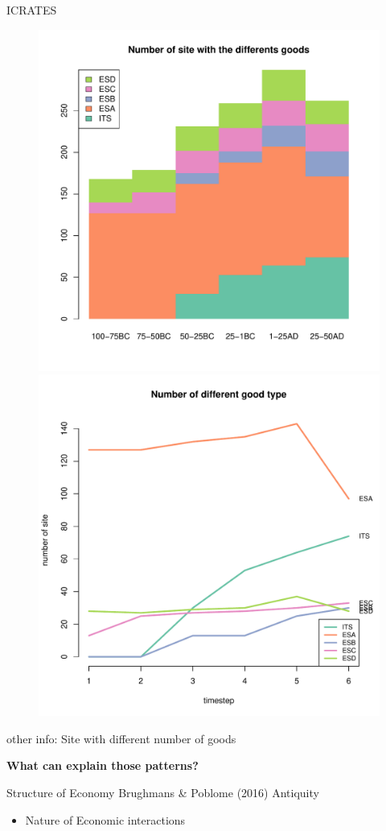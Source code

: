 \documentclass[12pt, notes=show]{beamer}
\begin{document}
\begin{frame}{ICRATES}
 \begin{figure}
     \includegraphics[width=.45\textwidth]{../images/hmNbSiteWGoodData.pdf}
     \includegraphics[width=.45\textwidth]{../images/plotNbSiteWGoodData.pdf}
     
 \end{figure}
 \begin{center}
     \tiny other info: Site with different number of goods
 \end{center}
\end{frame}



\begin{frame}{}
    \centering
    \Huge
    \bf
    What can explain those patterns?
\end{frame}

\begin{frame}{Structure of Economy}
    Brughmans \& Poblome (2016) Antiquity
    \begin{itemize}
	\item<1-> Nature of Economic interactions
	\begin{center}
	\end{center}
    \end{itemize}
\end{frame}
\end{document}
